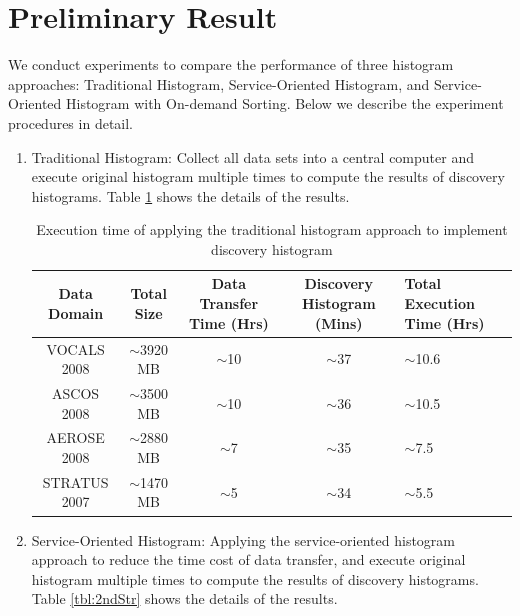 \documentclass[times, 10pt,onecolumn]{article} %
\begin{document}
\section{Preliminary Result}

We conduct experiments to compare the performance of three histogram approaches: Traditional Histogram, Service-Oriented Histogram, and Service-Oriented Histogram with On-demand Sorting. Below we describe the experiment procedures in detail.

\begin{enumerate}
\item{Traditional Histogram:} Collect all data sets into a central computer and execute original histogram multiple times to compute the results of discovery histograms. Table \ref{tbl:1stStr} shows the details of the results.

\begin{table}[!iht]
\centering
\begin{tabular}{|c|c|c|c|p{3cm}|}
\hline
\textbf{Data Domain} & \textbf{Total Size} & \textbf{ Data Transfer Time (Hrs)} & \textbf{Discovery Histogram (Mins)} & \textbf{Total Execution Time (Hrs)}  \\ \hline
VOCALS 2008 &  $\sim$3920 MB & $\sim$10 & $\sim$37& $\sim$10.6\\ \hline
ASCOS 2008 & $\sim$3500 MB & $\sim$10 & $\sim$36& $\sim$10.5\\ \hline 
AEROSE 2008 & $\sim$2880 MB & $\sim$7 & $\sim$35&  $\sim$7.5 \\\hline 
STRATUS 2007 & $\sim$1470 MB & $\sim$5  & $\sim$34&  $\sim$5.5\\\hline
\end{tabular}
\caption{ Execution time of applying the traditional histogram approach to implement discovery histogram }
\label{tbl:1stStr}
\end{table}

\item{Service-Oriented Histogram:} Applying the service-oriented histogram approach to reduce the time cost of data transfer, and execute original histogram multiple times to compute the results of discovery histograms. Table \ref{tbl:2ndStr} shows the details of the results.


\end{enumerate}
\end{document}
